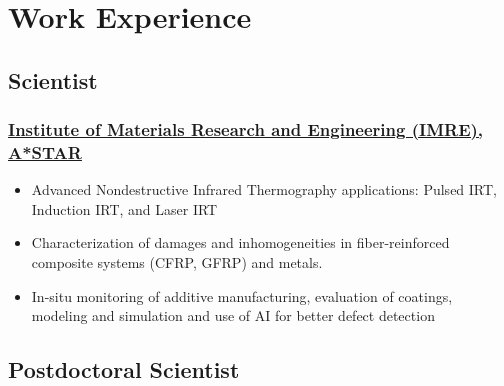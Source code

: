 \documentclass{my_cv}%
\begin{document}
\section{Work Experience}
\vspace{1.0em}
\subsection{Scientist}
\subsubsection{\href{https://www.a-star.edu.sg/imre}{Institute of Materials Research and Engineering (IMRE), A*STAR}}
\begin{itemize}[leftmargin=0.15in]
\setlength\itemsep{-0.1em}
\color{mygray}
\item Advanced Nondestructive Infrared Thermography applications: Pulsed IRT, Induction IRT, and Laser IRT
\item Characterization of damages and inhomogeneities in fiber-reinforced composite systems (CFRP, GFRP) and metals.
\item In-situ monitoring of additive manufacturing, evaluation of coatings, modeling and simulation and use of AI for better defect detection 
\end{itemize}%
{\color{mygray1} \hdashrule[0.1ex]{18.8cm}{0.2mm}{1mm}}
\subsection{Postdoctoral Scientist}
\end{document}
